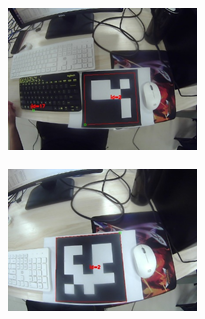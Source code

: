 \clearpage
\begin{figure}[htb]
	\begin{minipage}[t]{0.33\linewidth}
		\centering
		\includegraphics[width=\columnwidth]{figures/4-3a.png} 
		\label{fig:4-3a} 
	\end{minipage}
	\begin{minipage}[t]{0.33\linewidth} 
		\centering
		\includegraphics[width=\columnwidth]{figures/4-3b.png} 
		\label{fig:4-3b} 
	\end{minipage}
	\begin{minipage}[t]{0.33\linewidth} 
		\centering

\end{minipage}
\end{figure}
